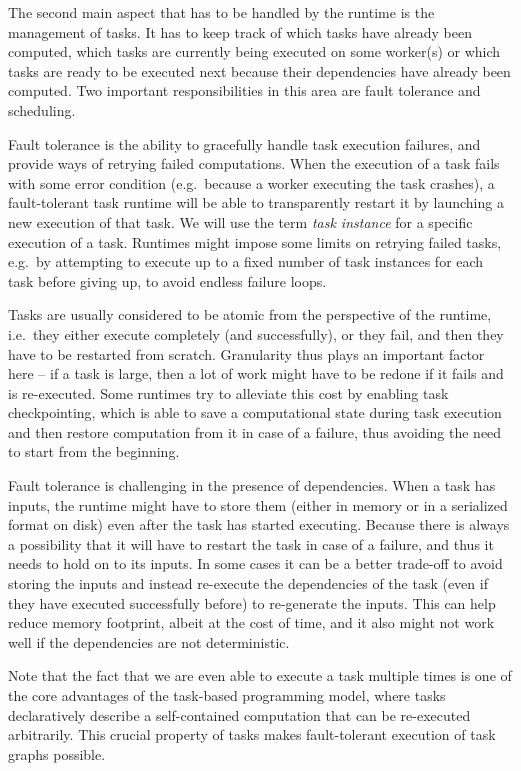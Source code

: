 The second main aspect that has to be handled by the runtime is the management of tasks. It has to
keep track of which tasks have already been computed, which tasks are currently being executed on
some worker(s) or which tasks are ready to be executed next because their dependencies have already
been computed. Two important responsibilities in this area are fault tolerance and scheduling.

Fault tolerance is the ability to gracefully handle task execution failures, and provide ways of
retrying failed computations. When the execution of a task fails with some error condition (e.g.\
because a worker executing the task crashes), a fault-tolerant task runtime will be able to
transparently restart it by launching a new execution of that task. We will use the term
\emph{task instance} for a specific execution of a task. Runtimes might impose some limits on
retrying failed tasks, e.g.\ by attempting to execute up to a fixed number of task instances for
each task before giving up, to avoid endless failure loops.

Tasks are usually considered to be atomic from the perspective of the runtime, i.e.\ they either
execute completely (and successfully), or they fail, and then they have to be restarted from
scratch. Granularity thus plays an important factor here -- if a task is large, then a lot of work
might have to be redone if it fails and is re-executed. Some runtimes try to alleviate this cost by
enabling task checkpointing, which is able to save a computational state during task execution and
then restore computation from it in case of a failure, thus avoiding the need to start from the
beginning.

Fault tolerance is challenging in the presence of dependencies. When a task has inputs, the runtime
might have to store them (either in memory or in a serialized format on disk) even after the task
has started executing. Because there is always a possibility that it will have to restart the task
in case of a failure, and thus it needs to hold on to its inputs. In some cases it can be a better
trade-off to avoid storing the inputs and instead re-execute the dependencies of the task (even if
they have executed successfully before) to re-generate the inputs. This can help reduce memory
footprint, albeit at the cost of time, and it also might not work well if the dependencies are not
deterministic.

Note that the fact that we are even able to execute a task multiple times is one of the core
advantages of the task-based programming model, where tasks declaratively describe a self-contained
computation that can be re-executed arbitrarily. This crucial property of tasks makes
fault-tolerant execution of task graphs possible.

